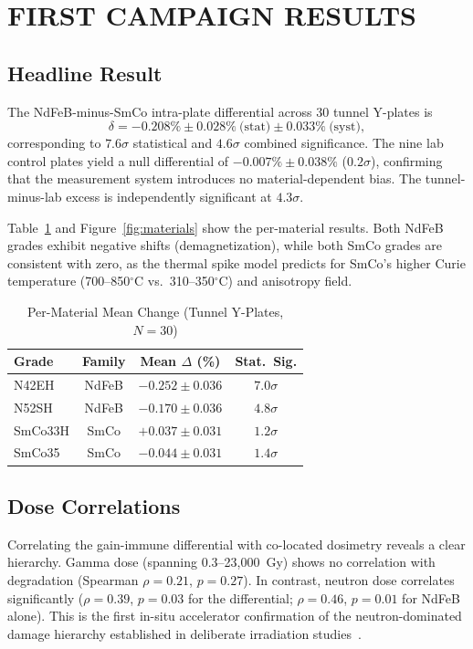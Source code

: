 \documentclass[a4paper,
               ]{jacow}
\begin{document}
\section{FIRST CAMPAIGN RESULTS}

\subsection{Headline Result}

The NdFeB-minus-SmCo intra-plate differential across 30 tunnel Y-plates is
\begin{equation}
\delta = -0.208\% \pm 0.028\%~\text{(stat)} \pm 0.033\%~\text{(syst)},
\end{equation}
corresponding to $7.6\sigma$ statistical and $4.6\sigma$ combined significance. The nine lab control plates yield a null differential of $-0.007\% \pm 0.038\%$ ($0.2\sigma$), confirming that the measurement system introduces no material-dependent bias. The tunnel-minus-lab excess is independently significant at $4.3\sigma$.

Table~\ref{tab:results} and Figure~\ref{fig:materials} show the per-material results. Both NdFeB grades exhibit negative shifts (demagnetization), while both SmCo grades are consistent with zero, as the thermal spike model predicts for SmCo's higher Curie temperature (700--850$^\circ$C vs.\ 310--350$^\circ$C) and anisotropy field.

\begin{table}[!htb]
\centering
\caption{Per-Material Mean Change (Tunnel Y-Plates, $N=30$)}
\label{tab:results}
\begin{tabular}{lccc}
\hline
\textbf{Grade} & \textbf{Family} & \textbf{Mean $\Delta$ (\%)} & \textbf{Stat.\ Sig.} \\
\hline
N42EH   & NdFeB & $-0.252 \pm 0.036$ & $7.0\sigma$ \\
N52SH   & NdFeB & $-0.170 \pm 0.036$ & $4.8\sigma$ \\
SmCo33H & SmCo  & $+0.037 \pm 0.031$ & $1.2\sigma$ \\
SmCo35  & SmCo  & $-0.044 \pm 0.031$ & $1.4\sigma$ \\
\hline
\end{tabular}
\end{table}

\subsection{Dose Correlations}

Correlating the gain-immune differential with co-located dosimetry reveals a clear hierarchy. Gamma dose (spanning 0.3--23,000~Gy) shows no correlation with degradation (Spearman $\rho = 0.21$, $p = 0.27$). In contrast, neutron dose correlates significantly ($\rho = 0.39$, $p = 0.03$ for the differential; $\rho = 0.46$, $p = 0.01$ for NdFeB alone). This is the first in-situ accelerator confirmation of the neutron-dominated damage hierarchy established in deliberate irradiation studies~\cite{Shen:2018, Bizen:2016}.
\end{document}
